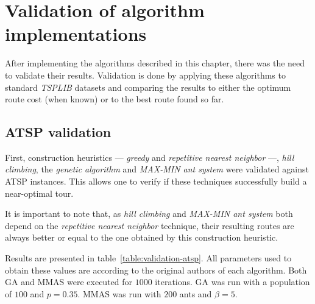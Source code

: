 \newpage

\section{Validation of algorithm implementations}
\label{section:validation}

After implementing the algorithms described in this chapter, there was the need
to validate their results. Validation is done by applying these algorithms to
standard \textit{TSPLIB} datasets and comparing the results to either the
optimum route cost (when known) or to the best route found so far.

\subsection{ATSP validation}
\label{section:atsp-validation}

First, construction heuristics --- \textit{greedy} and \textit{repetitive
nearest neighbor} ---, \textit{hill climbing}, the \textit{genetic algorithm}
and \textit{MAX-MIN ant system} were validated against ATSP instances. This
allows one to verify if these techniques successfully build a near-optimal
tour.

It is important to note that, as \textit{hill climbing} and \textit{MAX-MIN ant
system} both depend on the \textit{repetitive nearest neighbor} technique, their
resulting routes are always better or equal to the one obtained by this
construction heuristic.

Results are presented in table~\ref{table:validation-atsp}. All parameters used to
obtain these values are according to the original authors of each algorithm.
Both GA and MMAS were executed for $1000$ iterations. GA was run with a population of
$100$ and $p=0.35$. MMAS was run with $200$ ants and $\beta=5$.


